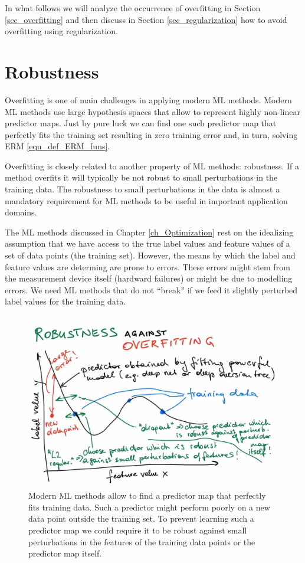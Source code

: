 \documentclass[12pt]{report}
\begin{document}
In what follows we will analyze the occurrence of overfitting in Section \ref{sec_overfitting} and then discuss in 
Section \ref{sec_regularization} how to avoid overfitting using regularization. 


\section{Robustness} 
\label{sec_robustness} 

Overfitting is one of main challenges in applying modern ML  methods. Modern ML 
methods use large hypothesis spaces that allow to represent highly non-linear predictor 
maps. Just by pure luck we can find one such predictor map that perfectly fits the 
training set resulting in zero training error and, in turn, solving ERM \eqref{equ_def_ERM_funs}. 

Overfitting is closely related to another property of ML methods: robustness. If a method 
overfits it will typically be not robust to small perturbations in the training data. The robustness 
to small perturbations in the data is almost a mandatory requirement for ML methods  to be 
useful in important application domains. 

The ML methods discussed in Chapter \ref{ch_Optimization} rest on the 
idealizing assumption that we have access to the true label values and feature 
values of a set of data points (the training set). However, the means by which 
the label and feature values are determing are prone to errors. These errors might 
stem from the measurement device itself (hardward failures) or might be 
due to modelling errors. We need ML methods that do not ``break'' if we feed 
it slightly perturbed label values for the training data. 




 \begin{figure}[htbp]
	\centering
	\includegraphics[width=\textwidth]{RobustnessOverfitting.jpg}  
	\caption{Modern ML methods allow to find a predictor map that perfectly fits 
		training data. Such a predictor might perform poorly on a new data point 
		outside the training set. To prevent learning such a predictor 
		map we could require it to be robust against small perturbations in the features of the 
        training data points or the predictor map itself.}
	\label{fig_polyn_training}
\end{figure}
\end{document}
